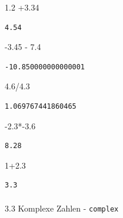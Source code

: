 \documentclass[
  11pt,
  a4paper,
  DIV=11,
  numbers=noendperiod]{scrartcl}
\makeatletter
\let\oldparagraph\paragraph
\renewcommand{\paragraph}{
    \@ifstar
      \xxxParagraphStar
      \xxxParagraphNoStar
  }
\newcommand{\xxxParagraphStar}[1]{\oldparagraph*{#1}\mbox{}}
\newcommand{\xxxParagraphNoStar}[1]{\oldparagraph{#1}\mbox{}}
\newenvironment{Shaded}{\begin{snugshade}}{\end{snugshade}}
\newcommand{\DecValTok}[1]{\textcolor[rgb]{0.68,0.00,0.00}{#1}}
\newcommand{\FloatTok}[1]{\textcolor[rgb]{0.68,0.00,0.00}{#1}}
\newcommand{\OperatorTok}[1]{\textcolor[rgb]{0.37,0.37,0.37}{#1}}
\makeatother
\begin{document}
\begin{Shaded}
\begin{Highlighting}[numbers=left,,]
\FloatTok{1.2} \OperatorTok{+}\FloatTok{3.34}
\end{Highlighting}
\end{Shaded}

\begin{verbatim}
4.54
\end{verbatim}

\begin{Shaded}
\begin{Highlighting}[numbers=left,,]
\OperatorTok{{-}}\FloatTok{3.45} \OperatorTok{{-}} \FloatTok{7.4}
\end{Highlighting}
\end{Shaded}

\begin{verbatim}
-10.850000000000001
\end{verbatim}

\begin{Shaded}
\begin{Highlighting}[numbers=left,,]
\FloatTok{4.6}\OperatorTok{/}\FloatTok{4.3}
\end{Highlighting}
\end{Shaded}

\begin{verbatim}
1.069767441860465
\end{verbatim}

\begin{Shaded}
\begin{Highlighting}[numbers=left,,]
\OperatorTok{{-}}\FloatTok{2.3}\OperatorTok{*{-}}\FloatTok{3.6}
\end{Highlighting}
\end{Shaded}

\begin{verbatim}
8.28
\end{verbatim}

\begin{Shaded}
\begin{Highlighting}[numbers=left,,]
\DecValTok{1}\OperatorTok{+}\FloatTok{2.3}
\end{Highlighting}
\end{Shaded}

\begin{verbatim}
3.3
\end{verbatim}

\paragraph{\texorpdfstring{3.3 Komplexe Zahlen -
\texttt{complex}}{3.3 Komplexe Zahlen - complex}}\label{komplexe-zahlen---complex}
\end{document}
